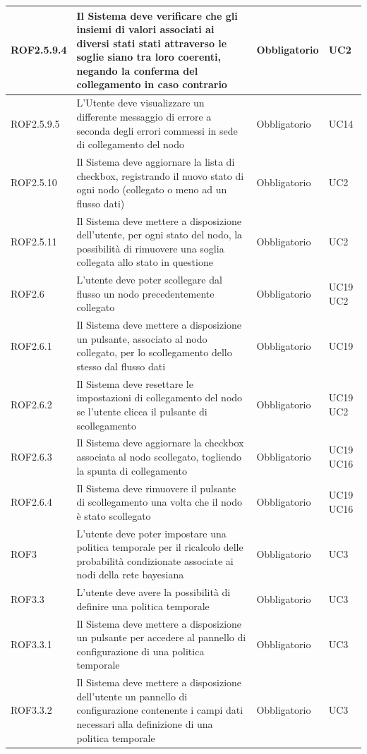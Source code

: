 \begin{center}
\begin{longtable}[c]{|m{}|m{}|m{}|m{}|}
\hline
ROF2.5.9.4 & Il Sistema deve verificare che gli insiemi di valori associati ai diversi stati stati attraverso le soglie siano tra loro coerenti, negando la conferma del collegamento in caso contrario & Obbligatorio & UC2\\
\hline
ROF2.5.9.5 & L'Utente deve visualizzare un differente messaggio di errore a seconda degli errori commessi in sede di collegamento del nodo & Obbligatorio & UC14\\
\hline
ROF2.5.10 & Il Sistema deve aggiornare la lista di checkbox, registrando il nuovo stato di ogni nodo (collegato o meno ad un flusso dati) & Obbligatorio & UC2\\
\hline
ROF2.5.11 & Il Sistema deve mettere a disposizione dell’utente, per ogni stato del nodo, la possibilità di rimuovere una soglia collegata allo stato in questione & Obbligatorio & UC2 \\
\hline
ROF2.6 & L'utente deve poter scollegare dal flusso un nodo precedentemente collegato & Obbligatorio & UC19 UC2\\
\hline
ROF2.6.1 & Il Sistema deve mettere a disposizione un pulsante, associato al nodo collegato, per lo scollegamento dello stesso dal flusso dati & Obbligatorio & UC19\\
\hline
ROF2.6.2 & Il Sistema deve resettare le impostazioni di collegamento del nodo se l'utente clicca il pulsante di scollegamento & Obbligatorio & UC19 UC2\\
\hline
ROF2.6.3 & Il Sistema deve aggiornare la checkbox associata al nodo scollegato, togliendo la spunta di collegamento & Obbligatorio & UC19 UC16\\
\hline
ROF2.6.4 & Il Sistema deve rimuovere il pulsante di scollegamento una volta che il nodo è stato scollegato & Obbligatorio & UC19 UC16\\
\hline
ROF3 & L'utente deve poter impostare una politica temporale per il ricalcolo delle probabilità condizionate associate ai nodi della rete bayesiana & Obbligatorio & UC3\\
\hline
\rowcolor{grigio}ROF3.3 & L'utente deve avere la possibilità di definire una politica temporale & Obbligatorio & UC3\\ 
\hline
ROF3.3.1 & Il Sistema deve mettere a disposizione un pulsante per accedere al pannello di configurazione di una politica temporale & Obbligatorio & UC3\\
\hline
\rowcolor{grigio}ROF3.3.2 & Il Sistema deve mettere a disposizione dell'utente un pannello di configurazione contenente i campi dati necessari alla definizione di una politica temporale & Obbligatorio & UC3\\

\end{longtable}
\end{center}
